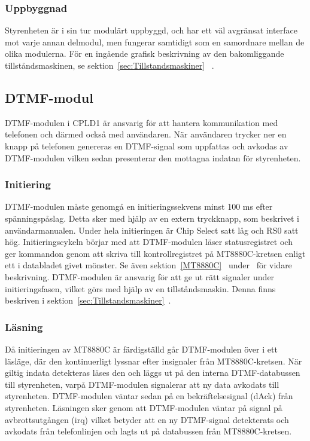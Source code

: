 \documentclass[a4paper,11pt]{article}
\begin{document}
	\subsubsection{Uppbyggnad}

	Styrenheten är i sin tur modulärt uppbyggd, och har ett väl avgränsat interface mot varje annan delmodul, men fungerar samtidigt som en samordnare mellan de olika modulerna. För en ingående grafisk beskrivning av den bakomliggande tillståndsmaskinen, se sektion~\ref{sec:Tillstandsmaskiner} ~.

	\subsection{DTMF-modul}
		
	DTMF-modulen i CPLD1 är ansvarig för att hantera kommunikation med telefonen och därmed också med användaren.
	När användaren trycker ner en knapp på telefonen genereras en DTMF-signal som uppfattas och avkodas av DTMF-modulen vilken sedan presenterar den mottagna indatan för styrenheten.
		
	\subsubsection{Initiering}

	DTMF-modulen måste genomgå en initieringssekvens minst 100 ms efter spänningspåslag. Detta sker med hjälp av
	en extern tryckknapp, som beskrivet i användarmanualen. Under hela initieringen är Chip Select satt låg
	och RS0 satt hög. Initieringscykeln börjar med att DTMF-modulen läser statusregistret och ger kommandon genom att skriva till kontrollregistret på MT8880C-kretsen enligt ett i databladet givet mönster. Se även sektion~\ref{MT8880C}~ under~ för vidare beskrivning.
	DTMF-modulen är ansvarig för att ge ut rätt signaler under initieringsfasen, vilket görs med hjälp av en tillståndsmaskin. Denna finns beskriven i sektion~\ref{sec:Tillstandsmaskiner}~.
		
	\subsubsection{Läsning}

	Då initieringen av MT8880C är färdigställd går DTMF-modulen över i ett läsläge, där den kontinuerligt lyssnar efter insignaler från MT8880C-kretsen. När giltig indata detekteras läses den och läggs ut på den interna DTMF-databussen till styrenheten, varpå DTMF-modulen signalerar att ny data avkodats till styrenheten. DTMF-modulen väntar sedan på en bekräftelsesignal (dAck) från styrenheten. Läsningen sker genom att DTMF-modulen väntar på signal på avbrottsutgången (irq) vilket betyder att en ny DTMF-signal detekterats och avkodats från telefonlinjen och lagts ut på databussen från MT8880C-kretsen.
\end{document}

